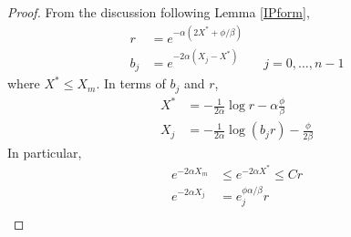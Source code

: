 \documentclass[thesis.tex]{subfiles}
\begin{document}
\begin{lemma}
\begin{proof}
From the discussion following Lemma \ref{IPform}, 
\begin{align*}
r &= e^{-\alpha(2 X^* + \phi/\beta)} \\
b_j &= e^{-2 \alpha(X_j - X^*)} && j = 0, \dots, n-1
\end{align*}
where $X^* \leq X_m$. In terms of $b_j$ and $r$,
\begin{align*}
X^* &= -\frac{1}{2\alpha}\log r - \alpha \frac{\phi}{\beta} \\
X_j &= -\frac{1}{2\alpha}\log(b_j r) - \frac{\phi}{2 \beta} 
\end{align*}
In particular,
\begin{align*}
e^{-2 \alpha X_m} &\leq e^{-2 \alpha X^*} \leq C r \\
e^{-2 \alpha X_j} &= e^{\phi \alpha/\beta} _j r \\
\end{align*}


\end{proof}
\end{lemma}
\end{document}
